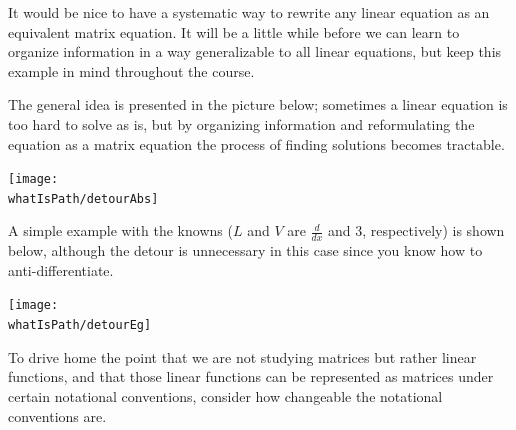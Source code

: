 It would be nice  to have a systematic way
to rewrite any linear equation as an equivalent matrix equation. 
It will be a little while before we can learn to  organize information in a way generalizable to all linear equations, 
but keep this example in mind throughout the course. 

The general idea is presented in the picture below; sometimes a linear equation is too hard to solve as is, but by organizing information and reformulating the equation as a matrix equation the process of finding solutions becomes tractable. 
\begin{center}
{\texttt{[image: \\whatIsPath/detourAbs]} }\\
\end{center}
A simple example with the knowns ($L$ and $V$ are $\frac{d}{dx}$ and $3$, respectively) is shown below, although the detour is unnecessary in this case since you know how to anti-differentiate.
\begin{center}
{\texttt{[image: \\whatIsPath/detourEg]} }\\
\end{center}


To drive home the point that we are not studying matrices but rather linear functions, and that those linear functions can be represented as matrices under certain notational conventions, 
consider how changeable the notational conventions are. 


